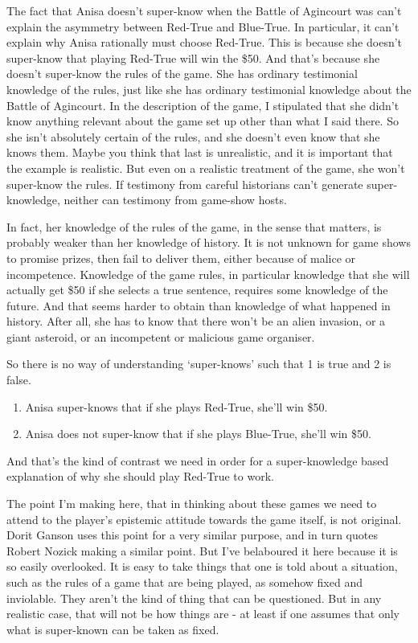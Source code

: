\documentclass[
  11pt,
]{book}
\providecommand{\tightlist}{%
  \setlength{\itemsep}{0pt}\setlength{\parskip}{0pt}}
\begin{document}
The fact that Anisa doesn't super-know when the Battle of Agincourt was can't explain the asymmetry between Red-True and Blue-True. In particular, it can't explain why Anisa rationally must choose Red-True. This is because she doesn't super-know that playing Red-True will win the \$50. And that's because she doesn't super-know the rules of the game. She has ordinary testimonial knowledge of the rules, just like she has ordinary testimonial knowledge about the Battle of Agincourt. In the description of the game, I stipulated that she didn't know anything relevant about the game set up other than what I said there. So she isn't absolutely certain of the rules, and she doesn't even know that she knows them. Maybe you think that last is unrealistic, and it is important that the example is realistic. But even on a realistic treatment of the game, she won't super-know the rules. If testimony from careful historians can't generate super-knowledge, neither can testimony from game-show hosts.

In fact, her knowledge of the rules of the game, in the sense that matters, is probably weaker than her knowledge of history. It is not unknown for game shows to promise prizes, then fail to deliver them, either because of malice or incompetence. Knowledge of the game rules, in particular knowledge that she will actually get \$50 if she selects a true sentence, requires some knowledge of the future. And that seems harder to obtain than knowledge of what happened in history. After all, she has to know that there won't be an alien invasion, or a giant asteroid, or an incompetent or malicious game organiser.

So there is no way of understanding `super-knows' such that 1 is true and 2 is false.

\begin{enumerate}
\def\labelenumi{\arabic{enumi}.}
\tightlist
\item
  Anisa super-knows that if she plays Red-True, she'll win \$50.
\item
  Anisa does not super-know that if she plays Blue-True, she'll win \$50.
\end{enumerate}

And that's the kind of contrast we need in order for a super-knowledge based explanation of why she should play Red-True to work.

The point I'm making here, that in thinking about these games we need to attend to the player's epistemic attitude towards the game itself, is not original. Dorit Ganson \citeyearpar{Ganson2019} uses this point for a very similar purpose, and in turn quotes Robert Nozick \citeyearpar{Nozick1981} making a similar point. But I've belaboured it here because it is so easily overlooked. It is easy to take things that one is told about a situation, such as the rules of a game that are being played, as somehow fixed and inviolable. They aren't the kind of thing that can be questioned. But in any realistic case, that will not be how things are - at least if one assumes that only what is super-known can be taken as fixed.
\end{document}
